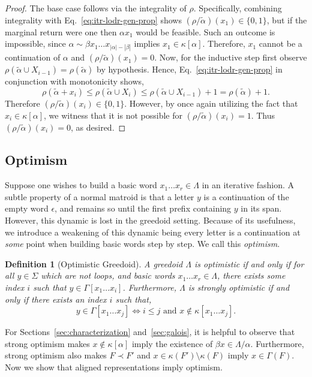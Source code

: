 \documentclass[11pt]{article}
\newtheorem{definition}[theorem]{Definition}
\newcommand{\univ}{\Sigma}
\newcommand{\glang}{\Lambda}
\begin{document}
\begin{proof}
    The base case follows via the integrality of $\rho$.
    Specifically, combining integrality with Eq.~\ref{eq:itr-lodr-gen-prop} shows $(\rho/\widetilde{\alpha})(x_1) \in \{0,1\}$, but if the marginal return were one then $\alpha x_1$ would be feasible.
    Such an outcome is impossible, since $\alpha \sim \beta x_1\ldots x_{|\alpha| - |\beta|}$ implies $x_1 \in \kappa[\alpha]$.
    Therefore, $x_1$ cannot be a continuation of $\alpha$ and $(\rho/\widetilde{\alpha})(x_1) = 0$. 
    Now, for the inductive step first observe $\rho(\widetilde{\alpha} \cup X_{i - 1}) = \rho(\widetilde{\alpha})$ by hypothesis.
    Hence, Eq.~\ref{eq:itr-lodr-gen-prop} in conjunction with monotonicity shows,
    \[ \rho(\widetilde{\alpha} + x_i) \leq \rho(\widetilde{\alpha} \cup X_i) \leq \rho(\widetilde{\alpha} \cup X_{i - 1}) + 1 = \rho(\widetilde{\alpha}) + 1. \]
    Therefore $(\rho/\widetilde{\alpha})(x_i) \in \{0,1\}$.
    However, by once again utilizing the fact that $x_i \in \kappa[\alpha]$, we witness that it is not possible for $(\rho/\widetilde{\alpha})(x_i) = 1$.
    Thus $(\rho/\widetilde{\alpha})(x_i) = 0$, as desired.
\end{proof}
\fi

\subsection{Optimism}\label{subsec:optimistic}

Suppose one wishes to build a basic word $x_1\ldots x_r \in\glang$ in an iterative fashion.
A subtle property of a normal matroid is that a letter $y$ is a continuation of the empty word $\epsilon$, and remains so until the first prefix containing $y$ in its span.
However, this dynamic is lost in the greedoid setting.
Because of its usefulness, we introduce a weakening of this dynamic being every letter is a continuation at \emph{some} point when building basic words step by step.
We call this \emph{optimism}.
\begin{definition}[Optimistic Greedoid]\label{def:optimism}
    A greedoid $\glang$ is \emph{optimistic} if and only if for all $y\in\univ$ which are not loops, and basic words $x_1\ldots x_r \in \glang$, there exists some index $i$ such that $y \in \Gamma[x_1\ldots x_i]$.
    Furthermore, $\glang$ is \emph{strongly optimistic} if and only if there exists an index $i$ such that,
    \[
        y \in \Gamma[x_1\ldots x_j] \iff i\leq j\text{ and }x \notin\kappa[x_1\ldots x_j]. 
    \]
\end{definition}
For Sections~\ref{sec:characterization} and~\ref{sec:galois}, it is helpful to observe that strong optimism makes $x\notin\kappa[\alpha]$ imply the existence of $\beta x\in\glang/\alpha$.
Furthermore, strong optimism also makes $F\prec F'$ and $x \in \kappa(F')\setminus\kappa(F)$ imply $x\in\Gamma(F)$.
Now we show that aligned representations imply optimism.
\end{document}
